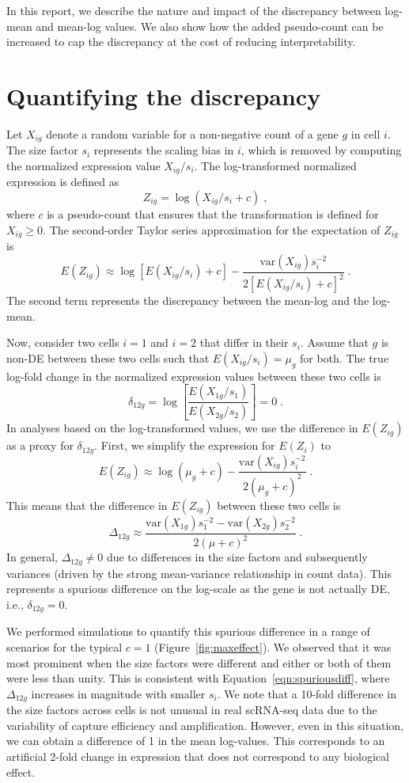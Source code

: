 \documentclass[10pt,letterpaper]{article}
\begin{document}
In this report, we describe the nature and impact of the discrepancy between log-mean and mean-log values.
We also show how the added pseudo-count can be increased to cap the discrepancy at the cost of reducing interpretability.

\section{Quantifying the discrepancy}
Let $X_{ig}$ denote a random variable for a non-negative count of a gene $g$ in cell $i$.
The size factor $s_i$ represents the scaling bias in $i$, which is removed by computing the normalized expression value $X_{ig}/s_i$.
The log-transformed normalized expression is defined as 
\[
Z_{ig} = \log(X_{ig} / s_i + c) \;,
\]
where $c$ is a pseudo-count that ensures that the transformation is defined for $X_{ig} \ge 0$.
The second-order Taylor series approximation for the expectation of $Z_{ig}$ is
\[
E(Z_{ig}) \approx \log[E(X_{ig}/s_i) + c] - \frac{\mbox{var}(X_{ig})s_i^{-2}}{2[E(X_{ig}/s_i) + c]^2} \;.
\]
The second term represents the discrepancy between the mean-log and the log-mean.

Now, consider two cells $i=1$ and $i=2$ that differ in their $s_i$.
Assume that $g$ is non-DE between these two cells such that $E(X_{ig}/s_i)=\mu_g$ for both.
The true log-fold change in the normalized expression values between these two cells is
\[
\delta_{12g} = \log\left[ \frac{E(X_{1g}/s_1)}{E(X_{2g}/s_2)} \right] = 0 \;.
\]
In analyses based on the log-transformed values, we use the difference in $E(Z_{ig})$ as a proxy for $\delta_{12g}$.
First, we simplify the expression for $E(Z_i)$ to
\[
E(Z_{ig}) \approx \log(\mu_g + c) - \frac{\mbox{var}(X_{ig})s_i^{-2}}{2(\mu_g + c)^2} \;.
\]
This means that the difference in $E(Z_{ig})$ between these two cells is 
\begin{equation}
\Delta_{12g} \approx \frac{\mbox{var}(X_{1g})s_1^{-2} -  \mbox{var}(X_{2g})s_2^{-2}}{2(\mu + c)^2} \;. \label{eqn:spuriousdiff}
\end{equation}
In general, $\Delta_{12g} \neq 0$ due to differences in the size factors and subsequently variances (driven by the strong mean-variance relationship in count data).
This represents a spurious difference on the log-scale as the gene is not actually DE, i.e., $\delta_{12g}=0$.

We performed simulations to quantify this spurious difference in a range of scenarios for the typical $c=1$ (Figure~\ref{fig:maxeffect}).
We observed that it was most prominent when the size factors were different and either or both of them were less than unity.
This is consistent with Equation~\ref{eqn:spuriousdiff}, where $\Delta_{12g}$ increases in magnitude with smaller $s_i$.
We note that a 10-fold difference in the size factors across cells is not unusual in real scRNA-seq data \cite{lun2016pooling} due to the variability of capture efficiency and amplification.
However, even in this situation, we can obtain a difference of 1 in the mean log-values.
This corresponds to an artificial 2-fold change in expression that does not correspond to any biological effect.
\end{document}
